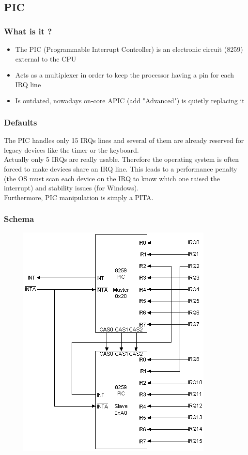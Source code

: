 \documentclass{beamer}
\begin{document}
\subsection{PIC}

\begin{frame}
  \frametitle{What is it ?}

  \begin{itemize}
  \item
    The PIC (Programmable Interrupt Controller) is an electronic circuit (8259) external to the CPU
  \item
    Acts as a multiplexer in order to keep the processor having a pin for each IRQ line
  \item
    Is outdated, nowadays on-core APIC (add "Advanced") is quietly replacing it
  \end{itemize}
\end{frame}

\begin{frame}
  \frametitle{Defaults}

    The PIC handles only 15 IRQs lines and several of them are already reserved for legacy devices like the timer or the keyboard.\\
    Actually only 5 IRQs are really usable. Therefore the operating system is often forced to make devices share an IRQ line. This leads to a performance penalty (the OS must scan each device on the IRQ to know which one raised the interrupt) and stability issues (for Windows).\\
  Furthermore, PIC manipulation is simply a PITA.
\end{frame}

\begin{frame}
  \frametitle{Schema}

  \begin{figure}
  \includegraphics[scale=0.42]{pic.png}
  \end{figure}
\end{frame}
\end{document}
